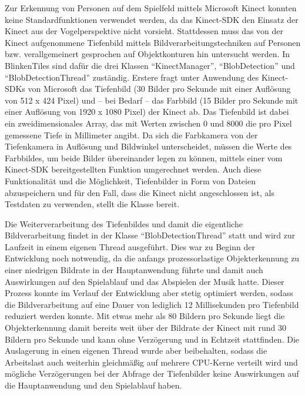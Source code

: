 \label{chp:objdet}

Zur Erkennung von Personen auf dem Spielfeld mittels Microsoft Kinect konnten keine Standardfunktionen verwendet werden, da das Kinect-SDK den Einsatz der Kinect aus der Vogelperspektive nicht vorsieht. Stattdessen muss das von der Kinect aufgenommene Tiefenbild mittels Bildverarbeitungstechniken auf Personen bzw. verallgemeinert gesprochen auf Objektkonturen hin untersucht werden. In BlinkenTiles sind dafür die drei Klassen \enquote{KinectManager}, \enquote{BlobDetection} und \enquote{BlobDetectionThread} zuständig. Erstere fragt unter Anwendung des Kinect-SDKs von Microsoft das Tiefenbild (30 Bilder pro Sekunde mit einer Auflösung von 512 x 424 Pixel) und -- bei Bedarf -- das Farbbild (15 Bilder pro Sekunde mit einer Auflösung von 1920 x 1080 Pixel) der Kinect ab. Das Tiefenbild ist dabei ein zweidimensionales Array, das mit Werten zwischen 0 und 8000 die pro Pixel gemessene Tiefe in Millimeter angibt. Da sich die Farbkamera von der Tiefenkamera in Auflösung und Bildwinkel unterscheidet, müssen die Werte des Farbbildes, um beide Bilder übereinander legen zu können, mittels einer vom Kinect-SDK bereitgestellten Funktion umgerechnet werden. Auch diese Funktionalität und die Möglichkeit, Tiefenbilder in Form von Dateien abzuspeichern und für den Fall, dass die Kinect nicht angeschlossen ist, als Testdaten zu verwenden, stellt die Klasse bereit.

Die Weiterverarbeitung des Tiefenbildes und damit die eigentliche Bildverarbeitung findet in der Klasse \enquote{BlobDetectionThread} statt und wird zur Laufzeit in einem eigenen Thread ausgeführt. Dies war zu Beginn der Entwicklung noch notwendig, da die anfangs prozessorlastige Objekterkennung zu einer niedrigen Bildrate in der Hauptanwendung führte und damit auch Auswirkungen auf den Spielablauf und das Abspielen der Musik hatte. Dieser Prozess konnte im Verlauf der Entwicklung aber stetig optimiert werden, sodass die Bildverarbeitung auf eine Dauer von lediglich 12 Millisekunden pro Tiefenbild reduziert werden konnte. Mit etwas mehr als 80 Bildern pro Sekunde liegt die Objekterkennung damit bereits weit über der Bildrate der Kinect mit rund 30 Bildern pro Sekunde und kann ohne Verzögerung und in Echtzeit stattfinden. Die Auslagerung in einen eigenen Thread wurde aber beibehalten, sodass die Arbeitslast auch weiterhin gleichmäßig auf mehrere CPU-Kerne verteilt wird und mögliche Verzögerungen bei der Abfrage der Tiefenbilder keine Auswirkungen auf die Hauptanwendung und den Spielablauf haben.

